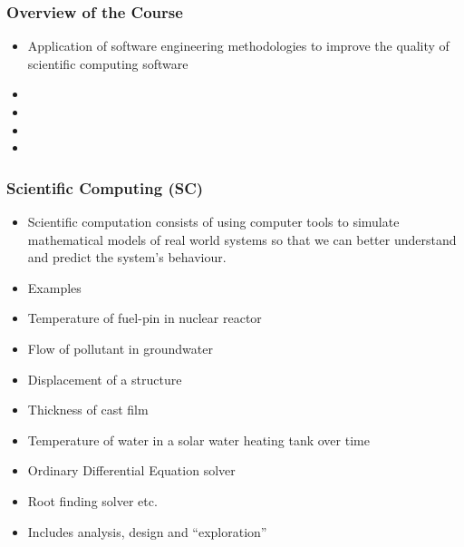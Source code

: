 \documentclass[t,12pt,numbers,fleqn]{beamer}
\begin{document}

\begin{frame}
\frametitle{Overview of the Course}

\begin{itemize}

\item Application of software engineering methodologies to improve the quality
  of scientific computing software
\item {}
\item {}
\item {}
\item {}

\end{itemize}

\end{frame}


\begin{frame}
\frametitle{Scientific Computing (SC)}

\begin{itemize}

\item Scientific computation consists of using computer tools to simulate
  mathematical models of real world systems so that we can better understand and
  predict the system’s behaviour.
\item Examples
\bi
\item Temperature of fuel-pin in nuclear reactor
\item Flow of pollutant in groundwater
\item Displacement of a structure
\item Thickness of cast film
\item Temperature of water in a solar water heating tank over time
\item Ordinary Differential Equation solver
\item Root finding solver etc.
\ei
\item Includes analysis, design and ``exploration'' %
\end{itemize}

\end{frame}
\end{document}
